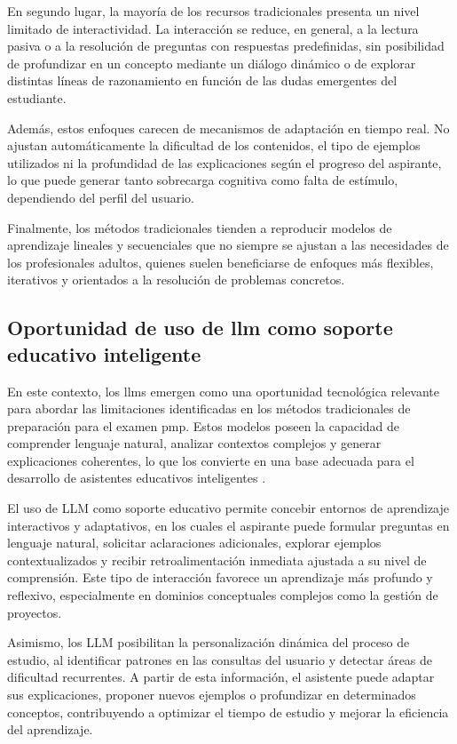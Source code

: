 En segundo lugar, la mayoría de los recursos tradicionales presenta un nivel limitado de interactividad. La interacción se reduce, en general, a la lectura pasiva o a la resolución de preguntas con respuestas predefinidas, sin posibilidad de profundizar en un concepto mediante un diálogo dinámico o de explorar distintas líneas de razonamiento en función de las dudas emergentes del estudiante.

Además, estos enfoques carecen de mecanismos de adaptación en tiempo real. No ajustan automáticamente la dificultad de los contenidos, el tipo de ejemplos utilizados ni la profundidad de las explicaciones según el progreso del aspirante, lo que puede generar tanto sobrecarga cognitiva como falta de estímulo, dependiendo del perfil del usuario.

Finalmente, los métodos tradicionales tienden a reproducir modelos de aprendizaje lineales y secuenciales que no siempre se ajustan a las necesidades de los profesionales adultos, quienes suelen beneficiarse de enfoques más flexibles, iterativos y orientados a la resolución de problemas concretos.

\subsection{Oportunidad de uso de \gls{llm} como soporte educativo inteligente}

En este contexto, los \glspl{llm} emergen como una oportunidad tecnológica relevante para abordar las limitaciones identificadas en los métodos tradicionales de preparación para el examen \gls{pmp}. Estos modelos poseen la capacidad de comprender lenguaje natural, analizar contextos complejos y generar explicaciones coherentes, lo que los convierte en una base adecuada para el desarrollo de asistentes educativos inteligentes \parencite{zhao2023survey}.

El uso de LLM como soporte educativo permite concebir entornos de aprendizaje interactivos y adaptativos, en los cuales el aspirante puede formular preguntas en lenguaje natural, solicitar aclaraciones adicionales, explorar ejemplos contextualizados y recibir retroalimentación inmediata ajustada a su nivel de comprensión. Este tipo de interacción favorece un aprendizaje más profundo y reflexivo, especialmente en dominios conceptuales complejos como la gestión de proyectos.

Asimismo, los LLM posibilitan la personalización dinámica del proceso de estudio, al identificar patrones en las consultas del usuario y detectar áreas de dificultad recurrentes. A partir de esta información, el asistente puede adaptar sus explicaciones, proponer nuevos ejemplos o profundizar en determinados conceptos, contribuyendo a optimizar el tiempo de estudio y mejorar la eficiencia del aprendizaje.

